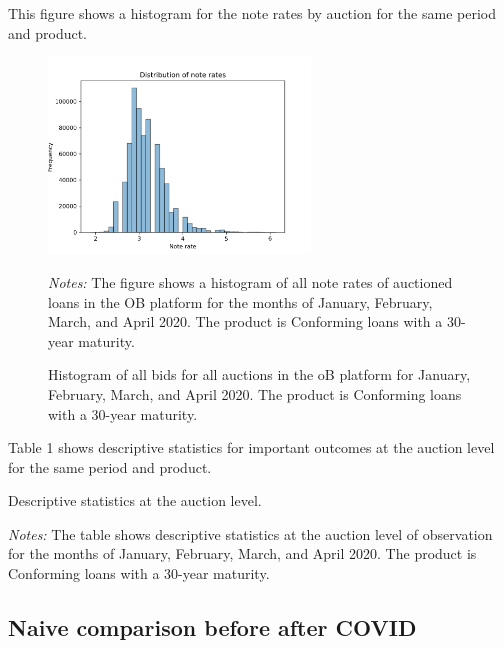 \documentclass[11pt,a4paper]{article}
\begin{document}
This figure shows a histogram for the note rates by auction for the same period and product.
\begin{figure}[h]
  \centering
  \includegraphics[width=0.62\textwidth]{../results/figures/distribution_of_noterates.png}
  \caption{Histogram of all bids for all auctions in the oB platform for January, February, March, and April 2020. The product is Conforming loans with a 30-year maturity.}
  \begin{minipage}{\textwidth}
      \footnotesize{\textit{Notes:} The figure shows a histogram of all note rates of auctioned loans in the OB platform for the months of January, February, March, and April 2020. The product is Conforming loans with a 30-year maturity. } 
      \end{minipage}
\end{figure}


\pagebreak
Table 1 shows descriptive statistics for important outcomes at the auction level for the same period and product. 


\begin{table}[h]
    \centering
    
    \caption{Descriptive statistics at the auction level. }
    \begin{minipage}{\textwidth}
        \footnotesize{\textit{Notes:} The table shows descriptive statistics at the auction level of observation for the months of January, February, March, and April 2020. The product is Conforming loans with a 30-year maturity. } 
        \end{minipage}
\end{table}


\subsection{Naive comparison before after COVID}
\end{document}
